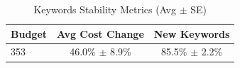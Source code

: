 \begin{table}[htbp]
\centering
\caption{Keywords Stability Metrics (Avg $\pm$ SE)}
\begin{tabular}{lcc}
\toprule
Budget & Avg Cost Change & New Keywords \\
\midrule
353 & 46.0\% $\pm$ 8.9\% & 85.5\% $\pm$ 2.2\% \\
\bottomrule
\end{tabular}
\end{table}
